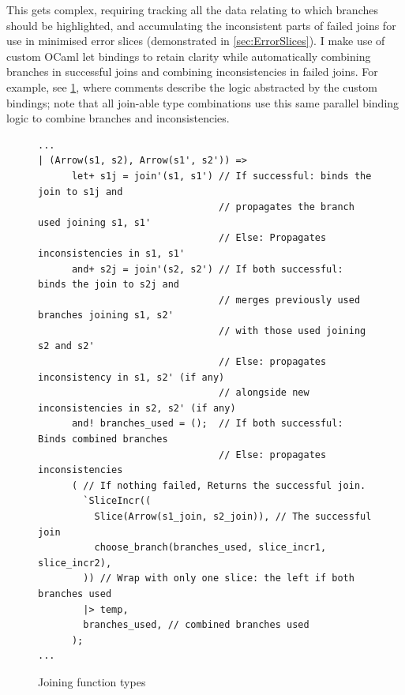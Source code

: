 This gets complex, requiring tracking all the data relating to which branches should be highlighted, and accumulating the inconsistent parts of failed joins for use in minimised error slices (demonstrated in \cref{sec:ErrorSlices}). I make use of custom OCaml let bindings to retain clarity while automatically combining branches in successful joins and combining inconsistencies in failed joins. For example, see \cref{fig:ArrowJoin}, where comments describe the logic abstracted by the custom bindings; note that all join-able type combinations use this same parallel binding logic to combine branches and inconsistencies.

\begin{figure}[h]
\small
\begin{verbatim}
...
| (Arrow(s1, s2), Arrow(s1', s2')) =>
      let+ s1j = join'(s1, s1') // If successful: binds the join to s1j and
                                // propagates the branch used joining s1, s1'
                                // Else: Propagates inconsistencies in s1, s1'
      and+ s2j = join'(s2, s2') // If both successful: binds the join to s2j and
                                // merges previously used branches joining s1, s2' 
                                // with those used joining s2 and s2'
                                // Else: propagates inconsistency in s1, s2' (if any)
                                // alongside new inconsistencies in s2, s2' (if any)
      and! branches_used = ();  // If both successful: Binds combined branches
                                // Else: propagates inconsistencies
      ( // If nothing failed, Returns the successful join.
        `SliceIncr((
          Slice(Arrow(s1_join, s2_join)), // The successful join
          choose_branch(branches_used, slice_incr1, slice_incr2),
        )) // Wrap with only one slice: the left if both branches used
        |> temp,
        branches_used, // combined branches used
      );
...
\end{verbatim}
\caption{Joining function types}
\label{fig:ArrowJoin}
\end{figure}

